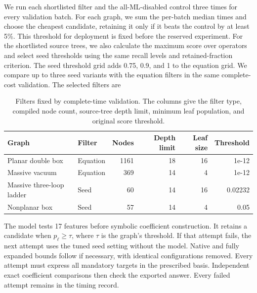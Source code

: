 We run each shortlisted filter and the all-ML-disabled control three times for every validation batch. For each graph, we sum the per-batch median times and choose the cheapest candidate, retaining it only if it beats the control by at least 5\%. This threshold for deployment is fixed before the reserved experiment. For the shortlisted source trees, we also calculate the maximum score over operators and select seed thresholds using the same recall levels and retained-fraction criterion. The seed threshold grid adds 0.75, 0.9, and 1 to the equation grid. We compare up to three seed variants with the equation filters in the same complete-cost validation. The selected filters are
\begin{table}[!htbp]\centering\small
\caption{Filters fixed by complete-time validation. The columns give the filter type, compiled node count, source-tree depth limit, minimum leaf population, and original score threshold.}
\begin{tabular}{@{}llrrrr@{}}\toprule
Graph & Filter & Nodes & Depth limit & Leaf size & Threshold\\\midrule
Planar double box & Equation & 1161 & 18 & 16 & 1e-12\\
Massive vacuum & Equation & 369 & 14 & 4 & 1e-12\\
Massive three-loop ladder & Seed & 60 & 14 & 16 & 0.02232\\
Nonplanar box & Seed & 57 & 14 & 4 & 0.05\\
\bottomrule\end{tabular}
\end{table}
The model tests 17 features before symbolic coefficient construction. It retains a candidate when $p_\ell\geq\tau$, where $\tau$ is the graph's threshold. If that attempt fails, the next attempt uses the tuned seed setting without the model. Native and fully expanded bounds follow if necessary, with identical configurations removed. Every attempt must express all mandatory targets in the prescribed basis. Independent exact coefficient comparisons then check the exported answer. Every failed attempt remains in the timing record.

